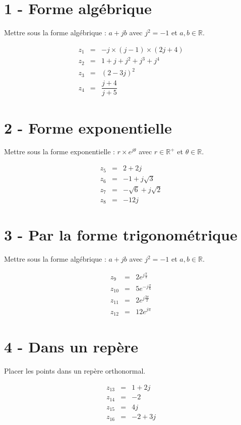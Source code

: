 \documentclass[11pt]{article}
\begin{document}
\begin{multicols}{2}

\section*{1 - Forme algébrique}
Mettre sous la forme algébrique : $a+jb$ avec $j^2 = -1$ et $a,b \in \mathbb{R}$.

\begin{eqnarray*}
	z_1 &=& -j \times (j -1) \times (2j+4) \\
	z_2 &=& 1 + j + j^2 + j^3 + j^4 \\
	z_3 &=& (2 - 3j)^2 \\
	z_4 &=& \dfrac{j+4}{j+5} 
\end{eqnarray*}

\section*{2 - Forme exponentielle}
Mettre sous la forme exponentielle : $r \times e^{j\theta}$ avec $r \in \mathbb{R^{+}}$ et $\theta \in \mathbb{R}$.

\begin{eqnarray*}
	z_5 &=& 2 + 2j \\
	z_6 &=& -1 + j\sqrt{3} \\
	z_7 &=& -\sqrt{6} + j\sqrt{2} \\
	z_8 &=& -12 j
\end{eqnarray*}


\section*{3 - Par la forme trigonométrique}
Mettre sous la forme algébrique : $a+jb$ avec $j^2 = -1$ et $a,b \in \mathbb{R}$.

\begin{eqnarray*}
	z_9 &=& 2 e^{j \frac{\pi}{3}} \\
	z_{10} &=& 5 e^{-j \frac{\pi}{6}} \\
	z_{11} &=& 2 e^{j \frac{3\pi}{2}}\\
	z_{12} &=& 12 e^{j \pi}
\end{eqnarray*}

\section*{4 - Dans un repère}
Placer les points dans un repère orthonormal.

\begin{eqnarray*}
	z_{13} &=& 1 + 2j \\
	z_{14} &=& -2 \\
	z_{15} &=&  4j \\
	z_{16} &=&  -2 + 3j
\end{eqnarray*}
\end{multicols}
\end{document}
